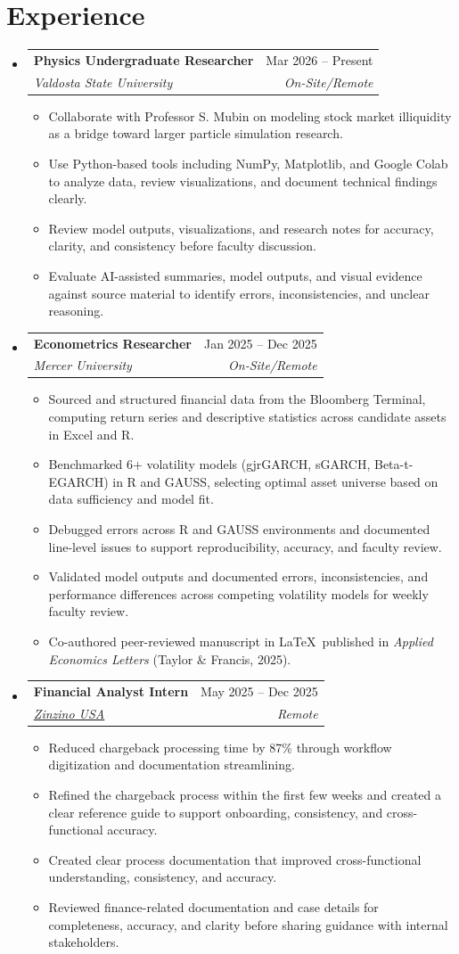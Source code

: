 \documentclass[letterpaper,11pt]{article}
\makeatletter
\newcommand{\resumeItem}[1]{
  \item\small{
    {#1 \vspace{-1pt}}
  }
}
\newcommand{\resumeSubheading}[4]{
  \vspace{-1pt}\item
    \begin{tabular*}{0.97\textwidth}[t]{l@{\extracolsep{\fill}}r}
      \textbf{#1} & #2 \\
      \textit{\small#3} & \textit{\small #4} \\
    \end{tabular*}\vspace{-6pt}
}
\newcommand{\resumeSubHeadingListStart}{\begin{itemize}[leftmargin=0.15in, label={}]}
\newcommand{\resumeSubHeadingListEnd}{\end{itemize}}
\newcommand{\resumeItemListStart}{\begin{itemize}}
\newcommand{\resumeItemListEnd}{\end{itemize}\vspace{-5pt}}
\makeatother
\begin{document}
\section{Experience}
  \resumeSubHeadingListStart
  \resumeSubheading
      {Physics Undergraduate Researcher}{Mar 2026 – Present}
      {Valdosta State University}{On-Site/Remote}
      \resumeItemListStart
        \resumeItem{Collaborate with Professor S. Mubin on modeling stock market illiquidity as a bridge toward larger particle simulation research.}
        \resumeItem{Use Python-based tools including NumPy, Matplotlib, and Google Colab to analyze data, review visualizations, and document technical findings clearly.}
        \resumeItem{Review model outputs, visualizations, and research notes for accuracy, clarity, and consistency before faculty discussion.}
        \resumeItem{Evaluate AI-assisted summaries, model outputs, and visual evidence against source material to identify errors, inconsistencies, and unclear reasoning.}
        \resumeItemListEnd
    \resumeSubheading
      {Econometrics Researcher}{Jan 2025 – Dec 2025}
      {Mercer University}{On-Site/Remote}
      \resumeItemListStart
        \resumeItem{Sourced and structured financial data from the Bloomberg Terminal, computing return series and descriptive statistics across candidate assets in Excel and R.}
        \resumeItem{Benchmarked 6+ volatility models (gjrGARCH, sGARCH, Beta-t-EGARCH) in R and GAUSS, selecting optimal asset universe based on data sufficiency and model fit.}
        \resumeItem{Debugged errors across R and GAUSS environments and documented line-level issues to support reproducibility, accuracy, and faculty review.}
        \resumeItem{Validated model outputs and documented errors, inconsistencies, and performance differences across competing volatility models for weekly faculty review.}
        \resumeItem{Co-authored peer-reviewed manuscript in \LaTeX\ published in \textit{Applied Economics Letters} (Taylor \& Francis, 2025).}
      \resumeItemListEnd
  \resumeSubHeadingListEnd

  \resumeSubHeadingListStart  
    \resumeSubheading
      {Financial Analyst Intern}{May 2025 – Dec 2025}
      {\href{https://www.zinzino.com/site/us/en-us/}{Zinzino USA}}{Remote}
      \resumeItemListStart
        \resumeItem{Reduced chargeback processing time by 87\% through workflow digitization and documentation streamlining.}
        \resumeItem{Refined the chargeback process within the first few weeks and created a clear reference guide to support onboarding, consistency, and cross-functional accuracy.}
        \resumeItem{Created clear process documentation that improved cross-functional understanding, consistency, and accuracy.}
        \resumeItem{Reviewed finance-related documentation and case details for completeness, accuracy, and clarity before sharing guidance with internal stakeholders.}
      \resumeItemListEnd
  \resumeSubHeadingListEnd
\end{document}
